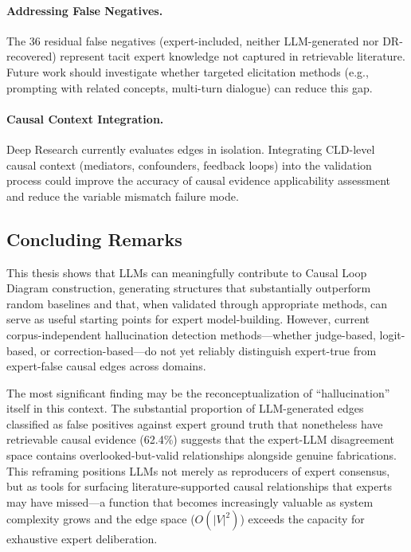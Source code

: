 \paragraph{Addressing False Negatives.}
The 36 residual false negatives (expert-included, neither LLM-generated nor DR-recovered) represent tacit expert knowledge not captured in retrievable literature. Future work should investigate whether targeted elicitation methods (e.g., prompting with related concepts, multi-turn dialogue) can reduce this gap.

\paragraph{Causal Context Integration.}
Deep Research currently evaluates edges in isolation. Integrating CLD-level causal context (mediators, confounders, feedback loops) into the validation process could improve the accuracy of causal evidence applicability assessment and reduce the variable mismatch failure mode.

\subsection{Concluding Remarks}
\label{sec:conclusion_remarks}

This thesis shows that LLMs can meaningfully contribute to Causal Loop Diagram construction, generating structures that substantially outperform random baselines and that, when validated through appropriate methods, can serve as useful starting points for expert model-building. However, current corpus-independent hallucination detection methods---whether judge-based, logit-based, or correction-based---do not yet reliably distinguish expert-true from expert-false causal edges across domains.

The most significant finding may be the reconceptualization of ``hallucination'' itself in this context. The substantial proportion of LLM-generated edges classified as false positives against expert ground truth that nonetheless have retrievable causal evidence (62.4\%) suggests that the expert-LLM disagreement space contains overlooked-but-valid relationships alongside genuine fabrications. This reframing positions LLMs not merely as reproducers of expert consensus, but as tools for surfacing literature-supported causal relationships that experts may have missed---a function that becomes increasingly valuable as system complexity grows and the edge space ($O(|V|^2)$) exceeds the capacity for exhaustive expert deliberation.

